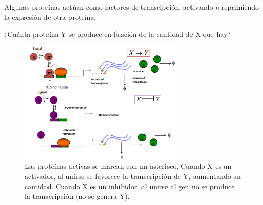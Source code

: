 Algunas proteínas actúan como factores de transcipción, activando o reprimiendo la expresión de otra proteína. 

¿Cuánta proteína Y se produce en función de la cantidad de X que hay?
\begin{figure}[h]
\centering
\includegraphics[width = 0.7\textwidth]{figs/factores-transcripcion.png}
\caption{Las proteínas activas se marcan con un asterisco. Cuando X es un activador, al unirse se favorece la transcripción de Y, aumentando su cantidad. Cuando X es un inhibidor, al unirse al gen no se produce la transcripción (no se genera Y).}
\end{figure}

